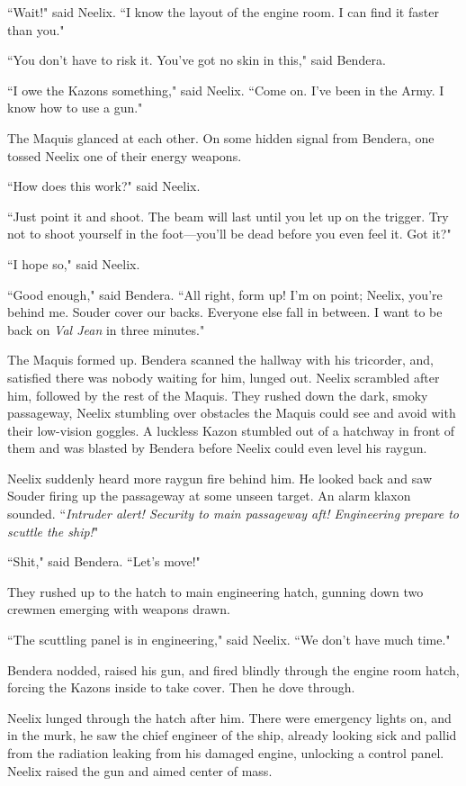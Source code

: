 \documentclass[twoside,letterpaper,12pt]{memoir}
\begin{document}
``Wait!" said Neelix. ``I know the layout of the engine room. I can find it faster than you."

``You don't have to risk it. You've got no skin in this," said Bendera.

``I owe the Kazons something," said Neelix. ``Come on. I've been in the Army. I know how to use a gun."

The Maquis glanced at each other. On some hidden signal from Bendera, one tossed Neelix one of their energy weapons.

``How does this work?" said Neelix.

``Just point it and shoot. The beam will last until you let up on the trigger. Try not to shoot yourself in the foot---you'll be dead before you even feel it. Got it?"

``I hope so," said Neelix.

``Good enough," said Bendera. ``All right, form up! I'm on point; Neelix, you're behind me. Souder cover our backs. Everyone else fall in between. I want to be back on \textit{Val Jean} in three minutes."

The Maquis formed up. Bendera scanned the hallway with his tricorder, and, satisfied there was nobody waiting for him, lunged out. Neelix scrambled after him, followed by the rest of the Maquis. They rushed down the dark, smoky passageway, Neelix stumbling over obstacles the Maquis could see and avoid with their low-vision goggles. A luckless Kazon stumbled out of a hatchway in front of them and was blasted by Bendera before Neelix could even level his raygun.

Neelix suddenly heard more raygun fire behind him. He looked back and saw Souder firing up the passageway at some unseen target. An alarm klaxon sounded. ``\textit{Intruder alert! Security to main passageway aft! Engineering prepare to scuttle the ship!}"

``Shit," said Bendera. ``Let's move!"

They rushed up to the hatch to main engineering hatch, gunning down two crewmen emerging with weapons drawn.

``The scuttling panel is in engineering," said Neelix. ``We don't have much time."

Bendera nodded, raised his gun, and fired blindly through the engine room hatch, forcing the Kazons inside to take cover. Then he dove through.

Neelix lunged through the hatch after him. There were emergency lights on, and in the murk, he saw the chief engineer of the ship, already looking sick and pallid from the radiation leaking from his damaged engine, unlocking a control panel. Neelix raised the gun and aimed center of mass.
\end{document}
